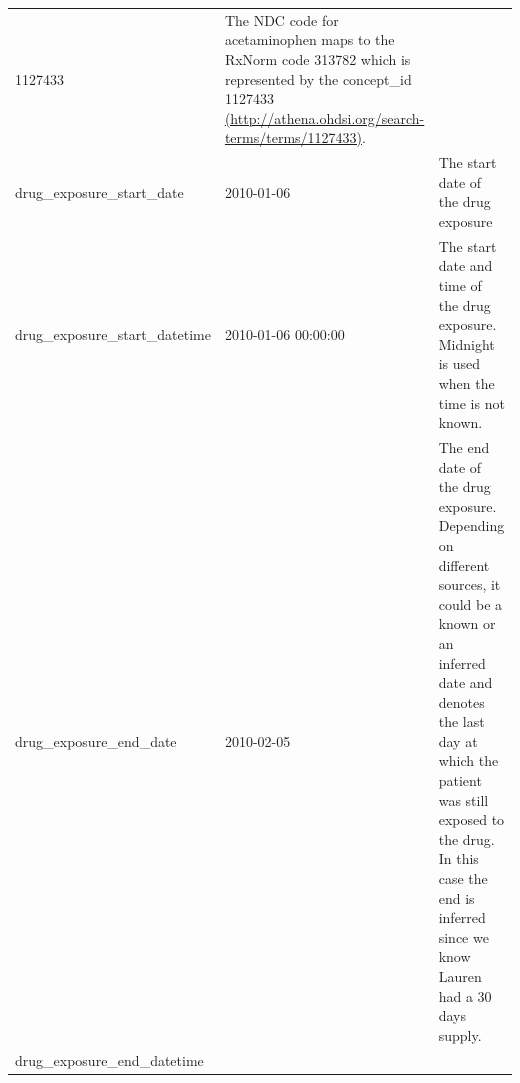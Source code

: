 \documentclass[]{book}
\begin{document}
\begin{longtable}[]{@{}lll@{}}
\begin{minipage}[t]{0.14\columnwidth}
1127433\strut
\end{minipage} & \begin{minipage}[t]{0.47\columnwidth}\raggedright\strut
The NDC code for acetaminophen maps to the RxNorm code 313782 which is
represented by the concept\_id 1127433
\href{http://athena.ohdsi.org/search-terms/terms/1127433}{(http://athena.ohdsi.org/search-terms/terms/1127433)}.\strut
\end{minipage}\tabularnewline
\begin{minipage}[t]{0.30\columnwidth}\raggedright\strut
drug\_exposure\_start\_date\strut
\end{minipage} & \begin{minipage}[t]{0.14\columnwidth}\raggedright\strut
2010-01-06\strut
\end{minipage} & \begin{minipage}[t]{0.47\columnwidth}\raggedright\strut
The start date of the drug exposure\strut
\end{minipage}\tabularnewline
\begin{minipage}[t]{0.30\columnwidth}\raggedright\strut
drug\_exposure\_start\_datetime\strut
\end{minipage} & \begin{minipage}[t]{0.14\columnwidth}\raggedright\strut
2010-01-06 00:00:00\strut
\end{minipage} & \begin{minipage}[t]{0.47\columnwidth}\raggedright\strut
The start date and time of the drug exposure. Midnight is used when the
time is not known.\strut
\end{minipage}\tabularnewline
\begin{minipage}[t]{0.30\columnwidth}\raggedright\strut
drug\_exposure\_end\_date\strut
\end{minipage} & \begin{minipage}[t]{0.14\columnwidth}\raggedright\strut
2010-02-05\strut
\end{minipage} & \begin{minipage}[t]{0.47\columnwidth}\raggedright\strut
The end date of the drug exposure. Depending on different sources, it
could be a known or an inferred date and denotes the last day at which
the patient was still exposed to the drug. In this case the end is
inferred since we know Lauren had a 30 days supply.\strut
\end{minipage}\tabularnewline
\begin{minipage}[t]{0.30\columnwidth}\raggedright\strut
drug\_exposure\_end\_datetime\strut
\end{minipage} & \begin{minipage}[t]{0.14\columnwidth}\raggedright\strut

\end{minipage}
\end{longtable}
\end{document}
